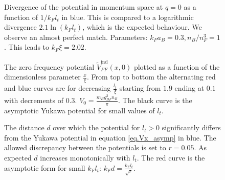 \begin{figure} 
\begin{center}  
  
\caption{Divergence of the potential in momentum space at $q=0$ as a function of $1/k_Fl_t$ in blue. This is compared to a logarithmic divergence $2.1\ln(k_Fl_t)$, which is the expected behaviour. We observe an almost perfect match. Parameters: $k_F a_B = 0.3, n_B/n_F^3 = 1$. This leads to $k_F\xi = 2.02$.}
\label{fig.Vq0}  
\end{center}    
\end{figure}

\begin{figure} 
\begin{center}  
  
\caption{The zero frequency potential $\tilde{V}_{FF}^\text{ind}(x,0)$ plotted as a function of the dimensionless parameter $\frac{x}{\xi}$. From top to bottom the alternating red and blue curves are for decreasing $\frac{l_t}{\xi}$ starting from $1.9$ ending at $0.1$ with decrements of $0.3$. $V_0 = \frac{m_Bg_{BF}^2n_B}{\pi}$. The black curve is the asymptotic Yukawa potential for small values of $l_t$.}  
\label{fig.Vx}  
\end{center}    
\end{figure}

\begin{figure} 
\begin{center}  
  
\caption{The distance $d$ over which the potential for $l_t > 0$ significantly differs from the Yukawa potential in equation \eqref{eq.Vx_asymp} in blue. The allowed discrepancy between the potentials is set to $r=0.05$. As expected $d$ increases monotonically with $l_t$. The red curve is the asymptotic form for small $k_Fl_t$: $k_Fd=\frac{k_F l_t}{\sqrt{r}}$.}  
\label{fig.Vx_disc}  
\end{center}    
\end{figure}








